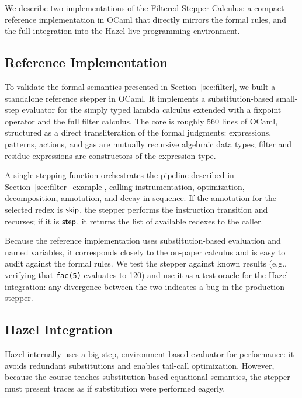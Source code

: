 
We describe two implementations of the Filtered Stepper Calculus: a
compact reference implementation in OCaml that directly mirrors the
formal rules, and the full integration into the Hazel live programming
environment.

\subsection{Reference Implementation}\label{sec:impl-mini}

To validate the formal semantics presented in Section~\ref{sec:filter},
we built a standalone reference stepper in OCaml. It implements a
substitution-based small-step evaluator for the simply typed lambda
calculus extended with a fixpoint operator and the full filter calculus.
The core is roughly 560 lines of OCaml, structured as a direct
transliteration of the formal judgments: expressions, patterns, actions,
and gas are mutually recursive algebraic data types; filter and residue
expressions are constructors of the expression type.

A single stepping function orchestrates the pipeline described in
Section~\ref{sec:filter_example}, calling instrumentation, optimization,
decomposition, annotation, and decay in sequence. If the annotation for
the selected redex is \(\mathsf{skip}\), the stepper performs the instruction
transition and recurses; if it is \(\mathsf{step}\), it returns the list of
available redexes to the caller.

Because the reference implementation uses substitution-based evaluation
and named variables, it corresponds closely to the on-paper calculus and
is easy to audit against the formal rules. We test the stepper against
known results (e.g., verifying that \texttt{fac(5)} evaluates to 120)
and use it as a test oracle for the Hazel integration: any divergence
between the two indicates a bug in the production stepper.

\subsection{Hazel Integration}\label{sec:impl-hazel}

Hazel internally uses a big-step, environment-based evaluator for
performance: it avoids redundant substitutions and enables tail-call
optimization. However, because the course teaches substitution-based
equational semantics, the stepper must present traces as if
substitution were performed eagerly.

